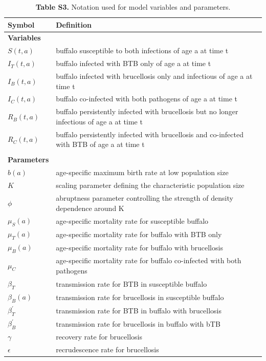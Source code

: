 \documentclass[11pt]{article}
\begin{document}
\begin{table} %
\caption*{\textbf{Table S3.} Notation used for model variables and parameters.}
\newcommand{\head}[1]{\textnormal{\textbf{#1}}}
\small
\begin{tabular}{ll} %
\hline
\head{Symbol} & \head{Definition}\\
\hline
\textbf{Variables} &   \\
$S(t, a)$ & buffalo susceptible to both infections of age a at time t  \\
$I_T(t, a)$ & buffalo infected with BTB only of age a at time t  \\
$I_B(t, a)$ & buffalo infected with brucellosis only and infectious of age a at time t \\
$I_C(t, a)$ & buffalo co-infected with both pathogens of age a at time t  \\
$R_B(t, a)$ & buffalo persistently infected with brucellosis but no longer infectious of age a at time t  \\
$R_C(t, a)$ & buffalo persistently infected with brucellosis and co-infected with BTB of age a at time t \\
& \\
\textbf{Parameters} &   \\
$b(a)$ & age-specific maximum birth rate at low population size\\
$K $& scaling parameter defining the characteristic population size \\
$\phi $& abruptness parameter controlling the strength of density dependence around K \\ 
$\mu_S(a) $& age-specific mortality rate for susceptible buffalo \\ 
$\mu_T(a) $& age-specific mortality rate for buffalo with BTB only \\ 
$\mu_B(a) $& age-specific mortality rate for buffalo with brucellosis \\ 
$\mu_C$ &age-specific mortality rate for buffalo co-infected with both pathogens \\ 
$\beta_T $ & transmission rate for BTB in susceptible buffalo \\
$\beta_B(a)$ & transmission rate for brucellosis in susceptible buffalo \\
$\beta_{T}^{'}$  & transmission rate for BTB in buffalo with brucellosis \\
$\beta_{B}^{'}$  & transmission rate for brucellosis in buffalo with bTB \\
$\gamma$& recovery rate for brucellosis \\
$\epsilon$& recrudescence rate for brucellosis \\
\hline 
\end{tabular}
\end{table}
\end{document}
